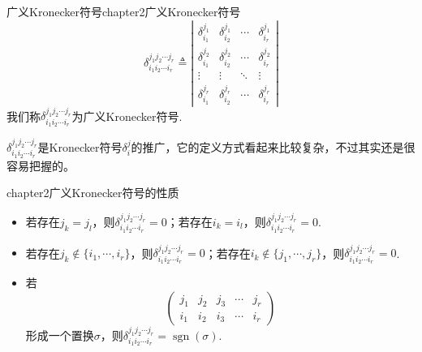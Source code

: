 \begin{mydef}{广义Kronecker符号}{chapter2广义Kronecker符号}
\[
\delta^{j_{1}j_{2}\cdots j_{r}}_{i_{1}i_{2}\cdots i_{r}}\triangleq \left|\begin{array}{cccc}\delta^{j_{1}}_{i_{1}} & \delta^{j_{1}}_{i_{2}} & \cdots & \delta^{j_{1}}_{i_{r}} \\ \delta^{j_{2}}_{i_{1}} & \delta^{j_{2}}_{i_{2}} & \cdots & \delta^{j_{2}}_{i_{r}} \\ \vdots & \vdots & \ddots& \vdots \\ \delta^{j_{r}}_{i_{1}} & \delta^{j_{r}}_{i_{2}} & \cdots & \delta^{j_{r}}_{i_{r}}\end{array}\right|
\]
我们称$\delta^{j_{1}j_{2}\cdots j_{r}}_{i_{1}i_{2}\cdots i_{r}}$为广义Kronecker符号.
\end{mydef}

$\delta^{j_{1}j_{2}\cdots j_{r}}_{i_{1}i_{2}\cdots i_{r}}$是Kronecker符号$\delta^{j}_{i}$的推广，它的定义方式看起来比较复杂，不过其实还是很容易把握的。
\begin{myprop}{}{chapter2广义Kronecker符号的性质}
\begin{itemize}
\item[(1)] 若存在$j_{k}=j_{l}$，则$\delta^{j_{1}j_{2}\cdots j_{r}}_{i_{1}i_{2}\cdots i_{r}}=0$；若存在$i_{k}=i_{l}$，则$\delta^{j_{1}j_{2}\cdots j_{r}}_{i_{1}i_{2}\cdots i_{r}}=0$.
\item[(2)] 若存在$j_{k}\notin \{i_{1},\cdots,i_{r} \}$，则$\delta^{j_{1}j_{2}\cdots j_{r}}_{i_{1}i_{2}\cdots i_{r}}=0$；若存在$i_{k}\notin \{j_{1},\cdots,j_{r} \}$，则$\delta^{j_{1}j_{2}\cdots j_{r}}_{i_{1}i_{2}\cdots i_{r}}=0$.
\item[(3)] 若
			\[
				\left(\begin{array}{lllll}
					j_{1} & j_{2} &j_{3} & \cdots & j_{r}  \\
					i_{1} & i_{2} & i_{3} & \cdots & i_{r} 
					\end{array}\right)
			\]
			形成一个置换$\sigma$，则$\delta^{j_{1}j_{2}\cdots j_{r}}_{i_{1}i_{2}\cdots i_{r}}=\operatorname{sgn}(\sigma)$.
\end{itemize}
\end{myprop}

